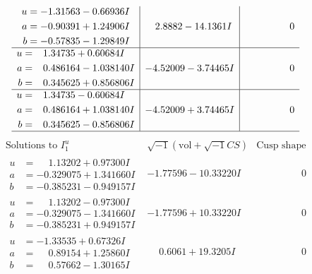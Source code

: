 \documentclass[1p]{elsarticle_modified}
\theoremstyle{definition}
\newcommand{\I}{\sqrt{-1}}
\begin{document}
$$\begin{array}{c|c|c}
\begin{aligned}
u &= -1.31563 - 0.66936 I \\
a &= -0.90391 + 1.24906 I \\
b &= -0.57835 - 1.29849 I\end{aligned}
 & \phantom{-}2.8882 - 14.1361 I & \phantom{-0.000000 } 0 \\ \hline\begin{aligned}
u &= \phantom{-}1.34735 + 0.60684 I \\
a &= \phantom{-}0.486164 - 1.038140 I \\
b &= \phantom{-}0.345625 + 0.856806 I\end{aligned}
 & -4.52009 - 3.74465 I & \phantom{-0.000000 } 0 \\ \hline\begin{aligned}
u &= \phantom{-}1.34735 - 0.60684 I \\
a &= \phantom{-}0.486164 + 1.038140 I \\
b &= \phantom{-}0.345625 - 0.856806 I\end{aligned}
 & -4.52009 + 3.74465 I & \phantom{-0.000000 } 0\\
 \hline 
 \end{array}$$\newpage$$\begin{array}{c|c|c}  
\text{Solutions to }I^u_{1}& \I (\text{vol} + \sqrt{-1}CS) & \text{Cusp shape}\\
 \hline 
\begin{aligned}
u &= \phantom{-}1.13202 + 0.97300 I \\
a &= -0.329075 + 1.341660 I \\
b &= -0.385231 - 0.949157 I\end{aligned}
 & -1.77596 - 10.33220 I & \phantom{-0.000000 } 0 \\ \hline\begin{aligned}
u &= \phantom{-}1.13202 - 0.97300 I \\
a &= -0.329075 - 1.341660 I \\
b &= -0.385231 + 0.949157 I\end{aligned}
 & -1.77596 + 10.33220 I & \phantom{-0.000000 } 0 \\ \hline\begin{aligned}
u &= -1.33535 + 0.67326 I \\
a &= \phantom{-}0.89154 + 1.25860 I \\
b &= \phantom{-}0.57662 - 1.30165 I\end{aligned}
 & \phantom{-}0.6061 + 19.3205 I & \phantom{-0.000000 } 0 \\ \hline\begin{aligned}

\end{aligned}
\end{array}$$
\end{document}
